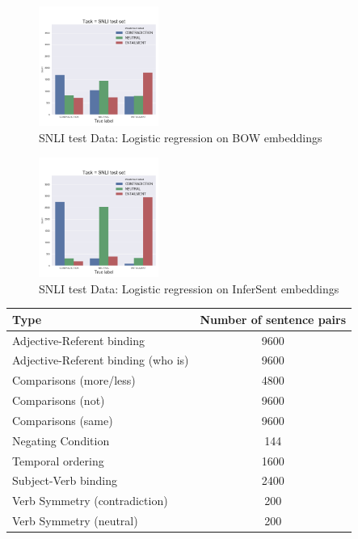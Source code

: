 \documentclass[10pt,letterpaper]{article}
\begin{document}
\begin{figure}[ht!]
\centering
\includegraphics[width=0.35\textwidth]{SNLIBOWLogRegHistAll.png}
\caption{SNLI test Data: Logistic regression on BOW embeddings}
\label{fig:SNLIBOWhist}
\end{figure}


\begin{figure}[ht!]
\centering
\includegraphics[width=0.35\textwidth]{SNLIInferSentLogRegHistAll.png}
\caption{SNLI test Data: Logistic regression on InferSent embeddings}
\label{fig:SNLIIShist}
\end{figure}

\bgroup
\def\arraystretch{1.5}
\begin{center}
 \begin{tabular}{||p{30mm} c||} 
 \hline
 Type & Number of sentence pairs \\ [0.5ex] 
 \hline\hline
 Adjective-Referent binding & 9600  \\
 \hline
 Adjective-Referent binding (who is) & 9600  \\
 \hline
 Comparisons (more/less)  & 4800 \\
 \hline
 Comparisons (not)  & 9600 \\
 \hline
 Comparisons (same)  & 9600 \\
 \hline
 Negating Condition & 144 \\[1ex] 
 \hline
 Temporal ordering & 1600 \\
 \hline
 Subject-Verb binding & 2400 \\ 
 \hline
 Verb Symmetry (contradiction) & 200 \\ 
 \hline
 Verb Symmetry (neutral) & 200 \\ 
 \hline
 
\end{tabular}
\end{center}
\end{document}
